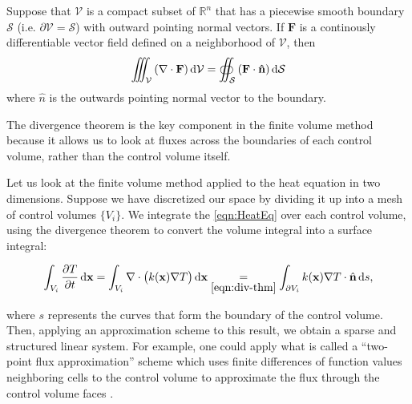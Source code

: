 \begin{thm}
	Suppose that $\mathcal{V}$ is a compact subset of $\mathbb{R}^n$ that has a piecewise smooth boundary $\mathcal{S}$ (i.e. $\partial\mathcal{V}=\mathcal{S}$) with outward pointing normal vectors. If $\mathbf{F}$ is a continously differentiable vector field defined on a neighborhood of $\mathcal{V}$, then
	\begin{equation}
		\iiint_{\mathcal{V}}\left(\nabla\cdot\mathbf{F}\right)\dif\mathcal{V}=\oiint_{\mathcal{S}}\left(\mathbf{F}\cdot\mathbf{\hat{n}}\right)\dif\mathcal{S}\label{eqn:div-thm}
	\end{equation}
	where $\hat{n}$ is the outwards pointing normal vector to the boundary.
	\label{thm:div-thm}
\end{thm}

The divergence theorem is the key component in the finite volume method because it allows us to look at fluxes across the boundaries of each control volume, rather than the control volume itself.

Let us look at the finite volume method applied to the heat equation in two dimensions. Suppose we have discretized our space by dividing it up into a mesh of control volumes $\lbrace V_i\rbrace$. We integrate the \eqref{eqn:HeatEq} over each control volume, using the divergence theorem to convert the volume integral into a surface integral:

\begin{equation}
	\int_{V_i}\frac{\partial T}{\partial t}\dif\mathbf{x}=\int_{V_i}\nabla\cdot \left(k(\mathbf{x})\nabla T\right)\dif\mathbf{x}\underset{\eqref{eqn:div-thm}}{=}\int_{\partial V_i}k(\mathbf{x})\nabla T\cdot\hat{\mathbf{n}}\dif s,\label{eqn:Vol-to-Surface-FVM}
\end{equation}

where $s$ represents the curves that form the boundary of the control volume. Then, applying an approximation scheme to this result, we obtain a sparse and structured linear system. For example, one could apply what is called a ``two-point flux approximation'' scheme which uses finite differences of function values neighboring cells to the control volume to approximate the flux through the control volume faces \cite{Versteeg2007}.

